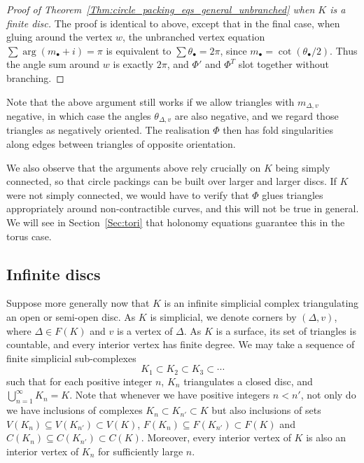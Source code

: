 \documentclass[12pt]{amsart}
\numberwithin{equation}{section}
\theoremstyle{named}
\newcommand{\refsec}[1]{Section~\ref{Sec:#1}}
\newcommand{\refthm}[1]{Theorem~\ref{Thm:#1}}
\begin{document}
\begin{proof}[Proof of \refthm{circle_packing_eqs_general_unbranched} when $K$ is a finite disc]
The proof is identical to above, except that in the final case, when gluing around the vertex $w$, the unbranched vertex equation $\sum \arg (m_\bullet + i) = \pi$ is equivalent to $\sum \theta_\bullet = 2\pi$, since $m_\bullet = \cot(\theta_\bullet/2)$. Thus the angle sum around $w$ is exactly $2\pi$, and $\Phi'$ and $\Phi^T$ slot together without branching.
\end{proof}

 
Note that the above argument still works if we allow triangles with $m_{\Delta,v}$ negative, in which case the angles $\theta_{\Delta,v}$ are also negative, and we regard those triangles as negatively oriented. The realisation $\Phi$ then has fold singularities along edges between triangles of opposite orientation.

We also observe that the arguments above rely crucially on $K$ being simply connected, so that circle packings can be built over larger and larger discs. If $K$ were not simply connected, we would have to verify that $\Phi$ glues triangles appropriately around non-contractible curves, and this will not be true in general. We will see in \refsec{tori} that holonomy equations guarantee this in the torus case.


\subsection{ Infinite discs }
\label{Sec:discs_in_general}


Suppose more generally now that $K$ is an infinite simplicial complex triangulating an open or semi-open disc. As $K$ is simplicial, we denote corners by $(\Delta,v)$, where $\Delta \in F(K)$ and $v$ is a vertex of $\Delta$. As $K$ is a surface, its set of triangles is countable, and every interior vertex has finite degree. We may take a sequence of finite simplicial sub-complexes
\[
K_1 \subset K_2 \subset K_3 \subset \cdots
\]
such that for each positive integer $n$, $K_n$ triangulates a closed disc, and $\bigcup_{n=1}^\infty K_n = K$. Note that whenever we have positive integers $n < n'$, not only do we have inclusions of complexes $K_n \subset K_{n'} \subset K$ but also inclusions of sets $V(K_n) \subseteq V(K_{n'}) \subset V(K)$, $F(K_n) \subseteq F(K_{n'}) \subset F(K)$ and $C(K_n) \subseteq C(K_{n'}) \subset C(K)$. Moreover, every interior vertex of $K$ is also an interior vertex of $K_n$ for sufficiently large $n$.
\end{document}

